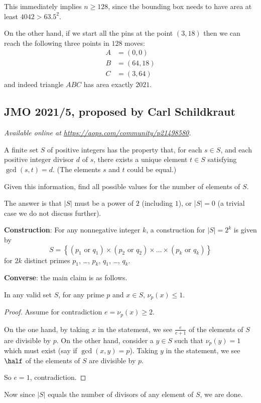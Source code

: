 \documentclass[11pt]{scrartcl}
\begin{document}
This immediately implies $n \ge 128$,
since the bounding box needs to have area at least $4042 > 63.5^2$.

On the other hand, if we start all the pins at
the point $(3,18)$ then we can reach the
following three points in $128$ moves:
\begin{align*}
  A &= (0,0) \\
  B &= (64,18) \\
  C &= (3,64)
\end{align*}
and indeed triangle $ABC$ has area exactly $2021$.
\pagebreak

\subsection{JMO 2021/5, proposed by Carl Schildkraut}
\textsl{Available online at \url{https://aops.com/community/p21498580}.}
\begin{mdframed}[style=mdpurplebox,frametitle={Problem statement}]
A finite set $S$ of positive integers has the property that,
for each $s\in S$, and each positive integer divisor $d$ of $s$,
there exists a unique element $t\in S$ satisfying $\gcd(s,t) = d$.
(The elements $s$ and $t$ could be equal.)

Given this information, find all possible values for the
number of elements of $S$.
\end{mdframed}
The answer is that $|S|$ must be a power of $2$ (including $1$),
or $|S| = 0$ (a trivial case we do not discuss further).

\medskip

\textbf{Construction}:
For any nonnegative integer $k$,
a construction for $|S| = 2^k$ is given
by
\[ S = \left\{
    (p_1 \text{ or } q_1)
    \times
    (p_2 \text{ or } q_2)
    \times
    \dots
    \times
    (p_k \text{ or } q_k)
  \right\}
\]
for $2k$ distinct primes $p_1$, \dots, $p_k$, $q_1$, \dots, $q_k$.

\medskip

\textbf{Converse}: the main claim is as follows.
\begin{claim*}
  In any valid set $S$,
  for any prime $p$ and $x \in S$, $\nu_p(x) \le 1$.
\end{claim*}
\begin{proof}
  Assume for contradiction $e = \nu_p(x) \ge 2$.
  \begin{itemize}
    \ii On the one hand, by taking $x$ in the statement,
    we see $\frac{e}{e+1}$ of the elements of $S$ are divisible by $p$.
    \ii On the other hand, consider a $y \in S$ such that
    $\nu_p(y)=1$ which must exist (say if $\gcd(x,y) = p$).
    Taking $y$ in the statement,
    we see $\half$ of the elements of $S$ are divisible by $p$.
  \end{itemize}
  So $e=1$, contradiction.
\end{proof}
Now since $|S|$ equals the number of divisors of any element of $S$,
we are done.
\pagebreak
\end{document}
